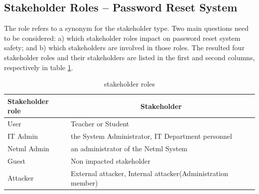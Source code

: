 \subsection{Stakeholder Roles -- Password Reset System}\label{Stakeholder Role}

The role refers to a synonym for the stakeholder type. Two main questions
need to be considered: a) which stakeholder roles impact on password
reset system safety; and b) which stakeholders are involved in those
roles. The  resulted four stakeholder roles and their stakeholders
are listed in the first and second columns, respectively in table
\ref{Stkroles}.

 \begin{table}[!htbp]	      %
	\begin{center}
\begin{tabular}{|l|p{5.5cm}|} \hline
 \textbf{Stakeholder role} & \multicolumn{1}{|c|}{\textbf{Stakeholder}} \\
\hline
 User & Teacher or Student \\
\hline
 IT Admin &  the System Administrator, IT Department personnel \\
\hline
 Netml Admin &  an administrator of the Netml System \\
\hline Guest & Non impacted stakeholder \\
\hline
 Attacker & External attacker, Internal attacker(Administration member) \\
\hline
	\end{tabular} \end{center} \caption{ stakeholder roles }
\label{Stkroles} \end{table}

